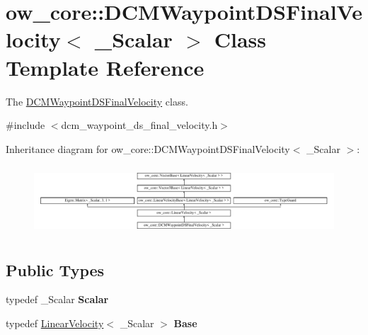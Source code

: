 \hypertarget{classow__core_1_1DCMWaypointDSFinalVelocity}{}\section{ow\+\_\+core\+:\+:D\+C\+M\+Waypoint\+D\+S\+Final\+Velocity$<$ \+\_\+\+Scalar $>$ Class Template Reference}
\label{classow__core_1_1DCMWaypointDSFinalVelocity}


The \hyperlink{classow__core_1_1DCMWaypointDSFinalVelocity}{D\+C\+M\+Waypoint\+D\+S\+Final\+Velocity} class.  




{\ttfamily \#include $<$dcm\+\_\+waypoint\+\_\+ds\+\_\+final\+\_\+velocity.\+h$>$}

Inheritance diagram for ow\+\_\+core\+:\+:D\+C\+M\+Waypoint\+D\+S\+Final\+Velocity$<$ \+\_\+\+Scalar $>$\+:\begin{figure}[H]
\begin{center}
\leavevmode
\includegraphics[height=2.599814cm]{db/d95/classow__core_1_1DCMWaypointDSFinalVelocity}
\end{center}
\end{figure}
\subsection*{Public Types}
\begin{DoxyCompactItemize}
\item 
typedef \+\_\+\+Scalar {\bfseries Scalar}\hypertarget{classow__core_1_1DCMWaypointDSFinalVelocity_aa991189277708f31453f2c6132d7c2fb}{}\label{classow__core_1_1DCMWaypointDSFinalVelocity_aa991189277708f31453f2c6132d7c2fb}

\item 
typedef \hyperlink{classow__core_1_1LinearVelocity}{Linear\+Velocity}$<$ \+\_\+\+Scalar $>$ {\bfseries Base}\hypertarget{classow__core_1_1DCMWaypointDSFinalVelocity_a36e34b57d3a21a6756d6b67674ca6aed}{}\label{classow__core_1_1DCMWaypointDSFinalVelocity_a36e34b57d3a21a6756d6b67674ca6aed}

\end{DoxyCompactItemize}
